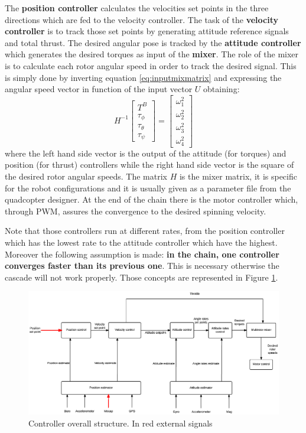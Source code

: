 The \textbf{position controller} calculates the velocities set points in the three directions which are fed to the velocity controller. The task of the \textbf{velocity controller} is to track those set points by generating attitude reference signals and total thrust. The desired angular pose is tracked by the \textbf{attitude controller} which generates the desired torques as input of the \textbf{mixer}. The role of the mixer is to calculate each rotor angular speed in order to track the desired signal. This is simply done by inverting equation \eqref{eq:inputmixmatrix} and expressing the angular speed vector in function of the input vector $U$ obtaining:\begin{equation}
H^{-1}\begin{bmatrix}
T^B\\\tau_\phi\\\tau_\theta\\\tau_\psi
\end{bmatrix} = \begin{bmatrix}
\omega_1^2\\\omega_2^2\\\omega_3^2\\\omega_4^2
\end{bmatrix}
\end{equation}
where the left hand side vector is the output of the attitude (for torques) and position (for thrust) controllers while the right hand side vector is the square of the desired rotor angular speeds. The matrix $H$ is the mixer matrix, it is specific for the robot configurations and it is usually given as a parameter file from the quadcopter designer. At the end of the chain there is the motor controller which, through PWM, assures the convergence to the desired spinning velocity. 

Note that those controllers run at different rates, from the position controller which has the lowest rate to the attitude controller which have the highest. Moreover the following assumption is made: \textbf{in the chain, one controller converges faster than its previous one}. This is necessary otherwise the cascade will not work properly. Those concepts are represented in Figure \ref{figure:controlarch}.

\begin{figure}[h]
	\centering
	\noindent
	\includegraphics[width=1\textwidth]{arch.eps}
	\caption{Controller overall structure. In red external signals}
	\label{figure:controlarch}
\end{figure}

